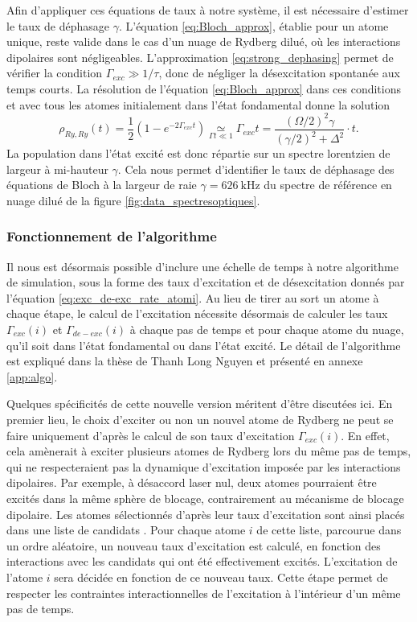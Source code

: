 Afin d'appliquer ces équations de taux à notre système, il est nécessaire d'estimer le taux de déphasage $\gamma$.
L'équation \eqref{eq:Bloch_approx}, établie pour un atome unique, reste valide dans le cas d'un nuage de Rydberg dilué, où les interactions dipolaires sont négligeables.
L'approximation \eqref{eq:strong_dephasing} permet de vérifier la condition $\Gamma_{exc} \gg 1/\tau$, donc de négliger la désexcitation spontanée aux temps courts.
La résolution de l'équation \eqref{eq:Bloch_approx} dans ces conditions et avec tous les atomes initialement dans l'état fondamental donne la solution 
\begin{equation}
\label{eq:Lorenztian_rhorr}
\rho_{Ry,Ry} (t) = \frac{1}{2}\left( 1-e^{-2\Gamma_{exc}t} \right)
\underset{\Gamma t \ll 1}{\simeq} \Gamma_{exc} t = \frac{(\Omega/2)^2 \gamma}{(\gamma/2)^2 + \Delta^2} \cdot t.
\end{equation}
La population dans l'état excité est donc répartie sur un spectre lorentzien de largeur à mi-hauteur $\gamma$.
Cela nous permet d'identifier le taux de déphasage des équations de Bloch à la largeur de raie $\gamma = \SI{626}{\kHz}$ du spectre de référence en nuage dilué de la figure \eqref{fig:data_spectresoptiques}.

	\subsubsection*{Fonctionnement de l'algorithme}
\noindent Il nous est désormais possible d'inclure une échelle de temps à notre algorithme de simulation, sous la forme des taux d'excitation et de désexcitation donnés par l'équation \eqref{eq:exc_de-exc_rate_atomi}.
Au lieu de tirer au sort un atome à chaque étape, le calcul de l'excitation nécessite désormais de calculer les taux $\Gamma_{exc}(i)$ et $\Gamma_{de-exc}(i)$ à chaque pas de temps et pour chaque atome du nuage, qu'il soit dans l'état fondamental ou dans l'état excité.
Le détail de l'algorithme est expliqué dans la thèse de Thanh Long Nguyen \cite{PHD_NGUYEN} et présenté en annexe \ref{app:algo}.

Quelques spécificités de cette nouvelle version méritent d'être discutées ici.
En premier lieu, le choix d'exciter ou non un nouvel atome de Rydberg ne peut se faire uniquement d'après le calcul de son taux d'excitation $\Gamma_{exc}(i)$.
En effet, cela amènerait à exciter plusieurs atomes de Rydberg lors du même pas de temps, qui ne respecteraient pas la dynamique d'excitation imposée par les interactions dipolaires.
Par exemple, à désaccord laser nul, deux atomes pourraient être excités dans la même sphère de blocage, contrairement au mécanisme de blocage dipolaire.
Les atomes sélectionnés d'après leur taux d'excitation sont ainsi placés dans une liste de \og candidats \fg{}.
Pour chaque atome $i$ de cette liste, parcourue dans un ordre aléatoire, un nouveau taux d'excitation est calculé, en fonction des interactions avec les candidats qui ont été effectivement excités.
L'excitation de l'atome $i$ sera décidée en fonction de ce nouveau taux.
Cette étape permet de respecter les contraintes interactionnelles de l'excitation à l'intérieur d'un même pas de temps.

